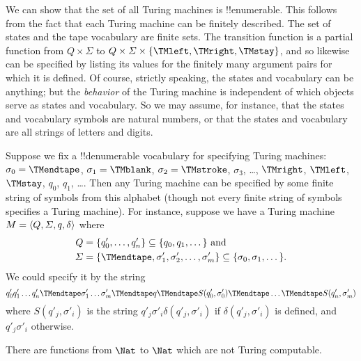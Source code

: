 \documentclass[../../../include/open-logic-section]{subfiles}
\begin{document}

\begin{explain}
We can show that the set of all Turing machines is
!!{enumerable}. This follows from the fact that each Turing machine
can be finitely described.  The set of states and the tape vocabulary
are finite sets.  The transition function is a partial function from
$Q \times \Sigma$ to $Q \times \Sigma \times \{\TMleft, \TMright,
\TMstay\}$, and so likewise can be specified by listing its values for
the finitely many argument pairs for which it is defined.  Of course,
strictly speaking, the states and vocabulary can be anything; but the
\emph{behavior} of the Turing machine is independent of which objects
serve as states and vocabulary. So we may assume, for instance, that
the states and vocabulary symbols are natural numbers, or that the
states and vocabulary are all strings of letters and digits.

Suppose we fix a !!{denumerable} vocabulary for specifying Turing
machines: $\sigma_0 = \TMendtape$, $\sigma_1 = \TMblank$, $\sigma_2 =
\TMstroke$, $\sigma_3$, \dots, $\TMright$, $\TMleft$, $\TMstay$,
$q_0$, $q_1$, \dots. Then any Turing machine can be specified by some
finite string of symbols from this alphabet (though not every finite
string of symbols specifies a Turing machine). For instance, suppose
we have a Turing machine $M = \langle Q, \Sigma, q, \delta \rangle$ where
\begin{align*}
  Q & =
  \{q'_0, \dots, q'_n\} \subseteq \{q_0, q_1, \dots \} \text{ and}\\
  \Sigma & = \{\TMendtape, \sigma'_1, \sigma'_2, \dots, \sigma'_m\}
  \subseteq \{\sigma_0, \sigma_1, \dots\}.
\end{align*}
We could specify it by the string
\[
q'_0 q'_1 \dots q'_n \TMendtape \sigma'_1 \dots \sigma'_m \TMendtape q
\TMendtape S(q_0',\sigma'_0)\TMendtape \dots \TMendtape S(q'_n,\sigma'_m)
\]
where $S(q'_j,\sigma'_i) $ is the string $q'_j \sigma'_i 
\delta(q'_j, \sigma'_i)$ if $\delta(q'_j, \sigma'_i)$ is defined, and
$q'_j \sigma'_i$ otherwise.
\end{explain}

\begin{thm}
There are functions from $\Nat$ to $\Nat$ which are not Turing
computable.
\end{thm}
\end{document}
